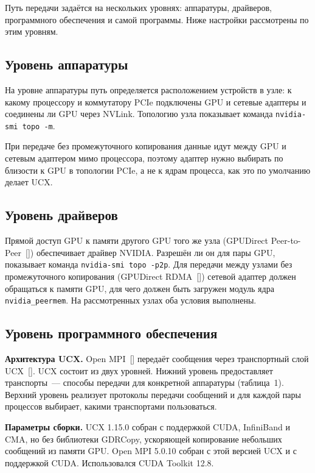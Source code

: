 Путь передачи задаётся на нескольких уровнях: аппаратуры, драйверов, программного обеспечения и самой программы. Ниже настройки рассмотрены по этим уровням.

\subsection{Уровень аппаратуры}

На уровне аппаратуры путь определяется расположением устройств в узле: к какому процессору и коммутатору PCIe подключены GPU и сетевые адаптеры и соединены ли GPU через NVLink. Топологию узла показывает команда \texttt{nvidia-smi topo -m}.

При передаче без промежуточного копирования данные идут между GPU и сетевым адаптером мимо процессора, поэтому адаптер нужно выбирать по близости к GPU в топологии PCIe, а не к ядрам процесса, как это по умолчанию делает UCX.

\subsection{Уровень драйверов}

Прямой доступ GPU к памяти другого GPU того же узла (GPUDirect Peer-to-Peer~[]) обеспечивает драйвер NVIDIA. Разрешён ли он для пары GPU, показывает команда \texttt{nvidia-smi topo -p2p}. Для передачи между узлами без промежуточного копирования (GPUDirect RDMA~[]) сетевой адаптер должен обращаться к памяти GPU, для чего должен быть загружен модуль ядра \texttt{nvidia\_peermem}. На рассмотренных узлах оба условия выполнены.

\subsection{Уровень программного обеспечения}

\textbf{Архитектура UCX.} Open MPI~[] передаёт сообщения через транспортный слой UCX~[]. UCX состоит из двух уровней. Нижний уровень предоставляет транспорты~--- способы передачи для конкретной аппаратуры (таблица~1). Верхний уровень реализует протоколы передачи сообщений и для каждой пары процессов выбирает, какими транспортами пользоваться.

\textbf{Параметры сборки.} UCX 1.15.0 собран с поддержкой CUDA, InfiniBand и CMA, но без библиотеки GDRCopy, ускоряющей копирование небольших сообщений из памяти GPU. Open MPI 5.0.10 собран с этой версией UCX и с поддержкой CUDA. Использовался CUDA Toolkit 12.8.

